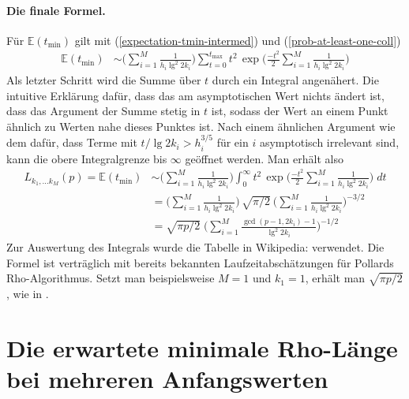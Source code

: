 \documentclass[a4paper, 10pt, ngerman]{article}
\newcommand{\E}{\mathbb{E}}
\begin{document}
\paragraph*{Die finale Formel.} \space \space Für $\E(t_{\min})$ gilt mit (\ref{expectation-tmin-intermed}) und (\ref{prob-at-least-one-coll})
\begin{align*}
    \E(t_{\min})
     & \sim \Bigg ( \sum_{i = 1}^M \frac 1 {h_i \lg^2 2k_i} \Bigg ) \sum_{t = 0}^{t_{\max}} t^2 \, \exp \Bigg ( \frac {-t^2} 2 \sum_{i = 1}^M \frac 1 {h_i \lg^2 2k_i} \Bigg )
\end{align*}
Als letzter Schritt wird die Summe über $t$ durch ein Integral angenähert. Die intuitive Erklärung dafür, dass das am asymptotischen Wert nichts ändert ist, dass das Argument der Summe stetig in $t$ ist, sodass der Wert an einem Punkt ähnlich zu Werten nahe dieses Punktes ist. Nach einem ähnlichen Argument wie dem dafür, dass Terme mit $t/\lg 2k_i > h_i^{3/5}$ für ein $i$ asymptotisch irrelevant sind, kann die obere Integralgrenze bis $\infty$ geöffnet werden. Man erhält also
\begin{align}
    L_{k_1, \dots k_M}(p) = \E(t_{\min})
     & \sim \Bigg ( \sum_{i = 1}^M \frac 1 {h_i \lg^2 2k_i} \Bigg ) \int_{0}^{\infty} t^2 \, \exp \Bigg ( \frac {-t^2} 2 \sum_{i = 1}^M \frac 1 {h_i \lg^2 2k_i} \Bigg ) \; dt \nonumber \\
     & = \Bigg (\sum_{i = 1}^M \frac 1 {h_i \lg^2 2k_i} \Bigg ) \, \sqrt {\pi / 2}  \ \Bigg ( \sum_{i = 1}^M \frac 1 {h_i \lg^2 2k_i} \Bigg )^{-3/2} \nonumber                           \\
     & = \sqrt{\pi p / 2} \; \Bigg ( \sum_{i = 1}^M \frac {\gcd(p - 1, 2k_i) - 1} {\lg^2 2k_i} \Bigg )^{-1/2}
    \label{expectation-tmin}
\end{align}
Zur Auswertung des Integrals wurde die Tabelle in Wikipedia: \cite{gint} verwendet. Die Formel ist verträglich mit bereits bekannten Laufzeitabschätzungen für Pollards Rho-Algorithmus. Setzt man beispielsweise $M = 1$ und $k_1 = 1$, erhält man $\sqrt{\pi p / 2}$, wie in \cite{pol75}.

\section{Die erwartete minimale Rho-Länge bei mehreren Anfangswerten}
\end{document}
